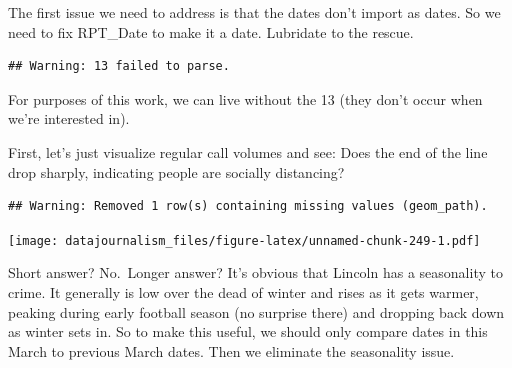 \documentclass[]{book}
\newenvironment{Shaded}{\begin{snugshade}}{\end{snugshade}}
\newcommand{\DataTypeTok}[1]{\textcolor[rgb]{0.13,0.29,0.53}{#1}}
\newcommand{\KeywordTok}[1]{\textcolor[rgb]{0.13,0.29,0.53}{\textbf{#1}}}
\newcommand{\NormalTok}[1]{#1}
\newcommand{\OperatorTok}[1]{\textcolor[rgb]{0.81,0.36,0.00}{\textbf{#1}}}
\newcommand{\StringTok}[1]{\textcolor[rgb]{0.31,0.60,0.02}{#1}}
\begin{document}
The first issue we need to address is that the dates don't import as dates. So we need to fix RPT\_Date to make it a date. Lubridate to the rescue.

\begin{Shaded}
\end{Shaded}

\begin{verbatim}
## Warning: 13 failed to parse.
\end{verbatim}

For purposes of this work, we can live without the 13 (they don't occur when we're interested in).

First, let's just visualize regular call volumes and see: Does the end of the line drop sharply, indicating people are socially distancing?

\begin{Shaded}
\end{Shaded}

\begin{verbatim}
## Warning: Removed 1 row(s) containing missing values (geom_path).
\end{verbatim}

\texttt{[image: datajournalism\_files/figure-latex/unnamed-chunk-249-1.pdf]}

Short answer? No.~Longer answer? It's obvious that Lincoln has a seasonality to crime. It generally is low over the dead of winter and rises as it gets warmer, peaking during early football season (no surprise there) and dropping back down as winter sets in. So to make this useful, we should only compare dates in this March to previous March dates. Then we eliminate the seasonality issue.
\end{document}

